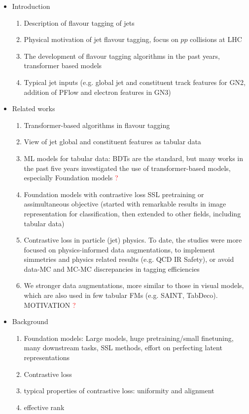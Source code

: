 \documentclass[12pt]{article}
\newcommand{\discussion}{\textcolor{red}{\Large ?}}
\begin{document}
\begin{itemize}
    \item Introduction
    \begin{enumerate}
        \item Description of flavour tagging of jets
        \item Physical motivation of jet flavour tagging, focus on $pp$ collisions at LHC
        \item The development of flavour tagging algorithms in the past years, transformer based models
        \item Typical jet inputs (e.g. global jet and constituent track features for GN2, addition of PFlow and electron features in GN3)
    \end{enumerate}
    
    \item Related works
    \begin{enumerate}
        \item Transformer-based algorithms in flavour tagging
        \item View of jet global and constituent features as tabular data
        \item ML models for tabular data: BDTs are the standard, but many works in the past five years investigated the use of transformer-based models, especially Foundation models \discussion
        \item Foundation models with contrastive loss SSL pretraining or assimultaneous objective (started with remarkable results in image representation for classification, then extended to other fields, including tabular data)
        \item Contrastive loss in particle (jet) physics. To date, the studies were more focused on physics-informed data augmentations, to implement simmetries and physics related results (e.g. QCD IR Safety), or avoid data-MC and MC-MC discrepancies in tagging efficiencies
        \item We stronger data augmentations, more similar to those in visual models, which are also used in few tabular FMs (e.g. SAINT, TabDeco). MOTIVATION \discussion 
    \end{enumerate}

    \item Background
    \begin{enumerate}
        \item Foundation models: Large models, huge pretraining/small finetuning, many downstream tasks, SSL methods, effort on perfecting latent representations
        \item Contrastive loss
        \item typical properties of contrastive loss: uniformity and alignment
        \item effective rank
    \end{enumerate}


\end{itemize}
\end{document}
